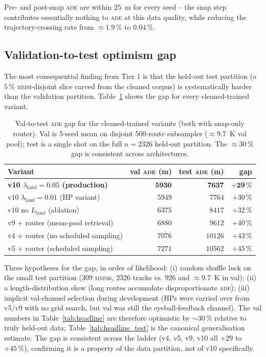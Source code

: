 \documentclass[oneside, a4paper, onecolumn, 11pt]{article}
\newcommand{\ade}{\textsc{ade}}
\begin{document}
Pre- and post-snap \ade{} are within $25$~m for every seed -- the
snap step contributes essentially nothing to \ade{} at this data
quality, while reducing the trajectory-crossing rate from
$\approx 1.9\,\%$ to $0.04\,\%$.

\subsection{Validation-to-test optimism gap}\label{sec:valtest}

The most consequential finding from Tier 1 is that the held-out test
partition (a $5\,\%$ \textsc{mmsi}-disjoint slice carved from the
cleaned corpus) is systematically harder than the validation partition.
Table~\ref{tab:valtest} shows the gap for every cleaned-trained
variant.

\begin{table}[h]
\centering
\caption{Val-to-test \ade{} gap for the cleaned-trained variants
(both with snap-only router).  Val is 5-seed mean on disjoint
500-route subsamples ($\approx 9.7$~K val pool);
test is a single shot on the full $n = 2326$ held-out partition.
The $\approx 30\,\%$ gap is consistent across architectures.}
\label{tab:valtest}
\begin{tabular}{lrrr}
\toprule
\textbf{Variant} & val \ade{} (m) & test \ade{} (m) & gap \\
\midrule
\textbf{v10 $\lambda_{\mathrm{land}} = 0.05$ (production)} & $\mathbf{5930}$ & $\mathbf{7637}$ & $\mathbf{+29\,\%}$ \\
v10 $\lambda_{\mathrm{land}} = 0.01$ (HP variant) & $5949$ & $7764$ & $+30\,\%$ \\
v10 no $L_{\mathrm{land}}$ (ablation) & $6375$ & $8417$ & $+32\,\%$ \\
v9 + router (mean-pool retrieval)     & $6880$ & $9612$ & $+40\,\%$ \\
v4 + router (no scheduled sampling)   & $7076$ & $10126$ & $+43\,\%$ \\
v5 + router (scheduled sampling)      & $7271$ & $10562$ & $+45\,\%$ \\
\bottomrule
\end{tabular}
\end{table}

Three hypotheses for the gap, in order of likelihood: (i) random
shuffle luck on the small test partition ($309$ \textsc{mmsi}s,
$2326$ tracks vs. $926$ and $\approx 9.7$~K in val); (ii) a
length-distribution skew (long routes accumulate disproportionate
\ade{}); (iii) implicit val-channel selection during development
(HPs were carried over from v5/v9 with no grid search, but val was
still the eyeball-feedback channel).  The val numbers in
Table~\ref{tab:headline} are therefore optimistic by $\sim\!30\,\%$
relative to truly held-out data; Table~\ref{tab:headline_test} is the
canonical generalisation estimate.  The gap is consistent across the
ladder (v4, v5, v9, v10 all $+29$ to $+45\,\%$), confirming it is a
property of the data partition, not of v10 specifically.
\end{document}
